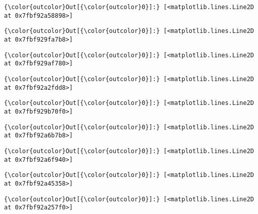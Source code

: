 \documentclass[11pt]{article}
\begin{document}
\begin{Verbatim}[commandchars=\\\{\}]
{\color{outcolor}Out[{\color{outcolor}0}]:} [<matplotlib.lines.Line2D at 0x7fbf92a58898>]
\end{Verbatim}
            
\begin{Verbatim}[commandchars=\\\{\}]
{\color{outcolor}Out[{\color{outcolor}0}]:} [<matplotlib.lines.Line2D at 0x7fbf929fa7b8>]
\end{Verbatim}
            
\begin{Verbatim}[commandchars=\\\{\}]
{\color{outcolor}Out[{\color{outcolor}0}]:} [<matplotlib.lines.Line2D at 0x7fbf929af780>]
\end{Verbatim}
            
\begin{Verbatim}[commandchars=\\\{\}]
{\color{outcolor}Out[{\color{outcolor}0}]:} [<matplotlib.lines.Line2D at 0x7fbf92a2fdd8>]
\end{Verbatim}
            
\begin{Verbatim}[commandchars=\\\{\}]
{\color{outcolor}Out[{\color{outcolor}0}]:} [<matplotlib.lines.Line2D at 0x7fbf929b70f0>]
\end{Verbatim}
            
\begin{Verbatim}[commandchars=\\\{\}]
{\color{outcolor}Out[{\color{outcolor}0}]:} [<matplotlib.lines.Line2D at 0x7fbf92a6b7b8>]
\end{Verbatim}
            
\begin{Verbatim}[commandchars=\\\{\}]
{\color{outcolor}Out[{\color{outcolor}0}]:} [<matplotlib.lines.Line2D at 0x7fbf92a6f940>]
\end{Verbatim}
            
\begin{Verbatim}[commandchars=\\\{\}]
{\color{outcolor}Out[{\color{outcolor}0}]:} [<matplotlib.lines.Line2D at 0x7fbf92a45358>]
\end{Verbatim}
            
\begin{Verbatim}[commandchars=\\\{\}]
{\color{outcolor}Out[{\color{outcolor}0}]:} [<matplotlib.lines.Line2D at 0x7fbf92a257f0>]
\end{Verbatim}
            
\end{document}
